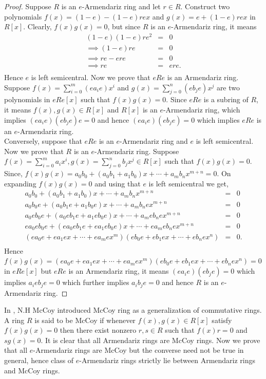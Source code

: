 \documentclass[12pt]{amsart}
\theoremstyle{plain}
\theoremstyle{definition}
\theoremstyle{remark}
\numberwithin{equation}{section}
\begin{document}
\begin{proof}
	Suppose $R$ is an $e$-Armendariz ring and let $r\in R$. Construct two polynomials $f(x)=(1-e)-(1-e)rex$ and $g(x)=e+(1-e)rex$ in $R[x]$. Clearly, $f(x)g(x)=0$, but since $R$ is an $e$-Armendariz ring, it means 
	\begin{eqnarray*}
		(1-e)(1-e)re^2&=&0\\
		\implies (1-e)re&=&0\\
		\implies re-ere&=&0\\
		\implies re&=&ere.\\	
	\end{eqnarray*}
	Hence $e$ is left semicentral. Now we prove that $eRe$ is an Armendariz ring. Suppose $f(x)=\sum_{i=0}^{m}(ea_ie)x^i$ and $g(x)=\sum_{j=0}^{n}(eb_je)x^j$ are two polynomials in $eRe[x]$ such that $f(x)g(x)=0$. Since $eRe$ is a subring of $R$, it means $f(x),g(x)\in R[x]$ and $R[x]$ is an $e$-Armendariz ring, which implies $(ea_ie)(eb_je)e=0$ and hence $(ea_ie)(eb_je)=0$ which implies $eRe$ is an $e$-Armendariz ring.\\
	Conversely, suppose that $eRe$ is an $e$-Armendariz ring and $e$ is left semicentral. Now we prove that $R$ is an $e$-Armendariz ring. Suppose $f(x)=\sum_{i=0}^{m}a_ix^i, g(x)=\sum_{j=0}^{n}b_jx^j\in R[x]$ such that $f(x)g(x)=0$. Since, $f(x)g(x)=a_0b_0+(a_0b_1+a_1b_0)x+\cdots+a_mb_nx^{m+n}=0.$ On expanding $f(x)g(x)=0$ and using that $e$ is left semicentral we get,
	\begin{eqnarray*}
	a_0b_0+(a_0b_1+a_1b_0)x+\cdots+a_mb_nx^{m+n}&=&0\\
	a_0b_0e+(a_0b_1e+a_1b_0e)x+\cdots+a_mb_nex^{m+n}&=&0\\
	a_0eb_0e+(a_0eb_1e+a_1eb_0e)x+\cdots+a_meb_nex^{m+n}&=&0\\
	ea_0eb_0e+(ea_0eb_1e+ea_1eb_0e)x+\cdots+ea_meb_nex^{m+n}&=&0\\
	(ea_0e+ea_1ex+\cdots+ea_mex^m)(eb_0e+eb_1ex+\cdots+eb_nex^n)&=&0.\\
	\end{eqnarray*}
	Hence $f(x)g(x)=(ea_0e+ea_1ex+\cdots+ea_mex^m)(eb_0e+eb_1ex+\cdots+eb_nex^n)=0$ in $eRe[x]$ but $eRe$ is an Armendariz ring, it means $(ea_ie)(eb_je)=0$ which implies $a_ieb_je=0$ which further implies $a_ib_je=0$ and hence $R$ is an $e$-Armendariz ring.
\end{proof}
In \cite{R}, N.H McCoy introduced McCoy ring as a generalization of commutative rings. A ring $R$ is said to be McCoy if whenever $f(x),g(x)\in R[x]$ satisfy $f(x)g(x)=0$ then there exist nonzero $r,s\in R$ such that $f(x)r=0$ and $sg(x)=0$. It is clear that all Armendariz rings are McCoy rings. Now we prove that all $e$-Armendariz rings are McCoy but the converse need not be true in general, hence class of $e$-Armendariz rings strictly lie between Armendariz rings and McCoy rings.
\end{document}

